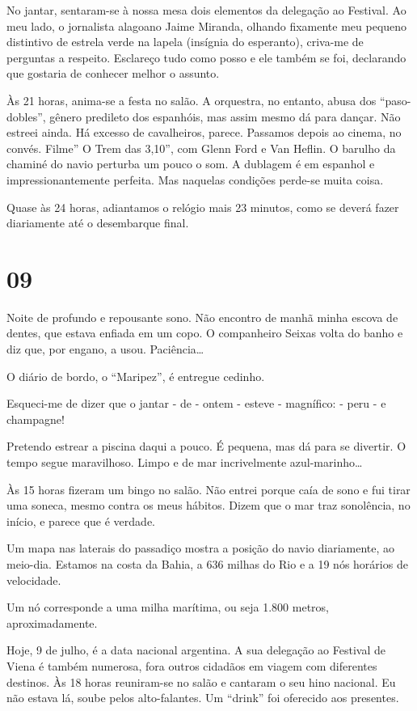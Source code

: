No jantar, sentaram-se à nossa mesa dois elementos da delegação ao Festival. Ao meu lado, o jornalista alagoano Jaime Miranda, olhando fixamente meu pequeno distintivo de estrela verde na lapela (insígnia do esperanto), criva-me de perguntas a respeito. Esclareço tudo como posso e ele também se foi, declarando que gostaria de conhecer melhor o assunto.

Às 21 horas, anima-se a festa no salão. A orquestra, no entanto, abusa dos “paso-dobles”, gênero predileto dos espanhóis, mas assim mesmo dá para dançar. Não estreei ainda. Há excesso de cavalheiros, parece. Passamos depois ao cinema, no convés. Filme” O Trem das 3,10”, com Glenn Ford e Van Heflin. O barulho da chaminé do navio perturba um pouco o som. A dublagem é em espanhol e impressionantemente perfeita. Mas naquelas condições perde-se muita coisa.

Quase às 24 horas, adiantamos o relógio mais 23 minutos, como se deverá fazer diariamente até o desembarque final.

\section*{09 \adfflatleafright {}}

Noite de profundo e repousante sono. Não encontro de manhã minha escova de dentes, que estava enfiada em um copo. O companheiro Seixas volta do banho e diz que, por engano, a usou. Paciência\ldots

O diário de bordo, o “Maripez”, é entregue cedinho.

Esqueci-me de dizer que o jantar - de - ontem - esteve - magnífico: - peru - e champagne!

Pretendo estrear a piscina daqui a pouco. É pequena, mas dá para se divertir. O tempo segue maravilhoso. Limpo e de mar incrivelmente azul-marinho\ldots

Às 15 horas fizeram um bingo no salão. Não entrei porque caía de sono e fui tirar uma soneca, mesmo contra os meus hábitos. Dizem que o mar traz sonolência, no início, e parece que é verdade.

Um mapa nas laterais do passadiço mostra a posição do navio diariamente, ao meio-dia. Estamos na costa da Bahia, a 636 milhas do Rio e a 19 nós horários de velocidade.

Um nó corresponde a uma milha marítima, ou seja 1.800 metros, aproximadamente.

Hoje, 9 de julho, é a data nacional argentina. A sua delegação ao Festival de Viena é também numerosa, fora outros cidadãos em viagem com diferentes destinos. Às 18 horas reuniram-se no salão e cantaram o seu hino nacional. Eu não estava lá, soube pelos alto-falantes. Um “drink” foi oferecido aos presentes.

